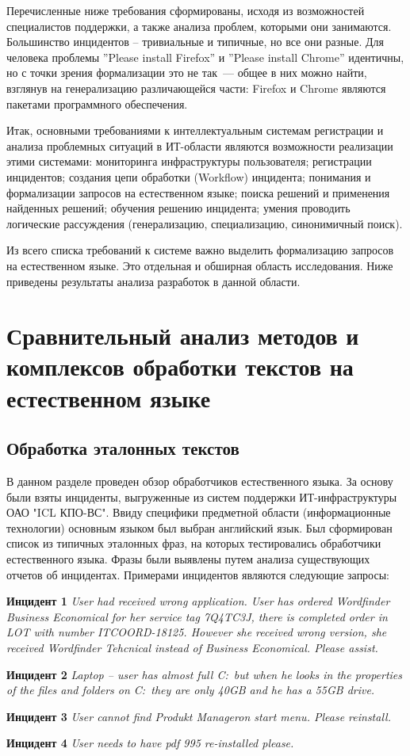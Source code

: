 Перечисленные ниже требования сформированы, исходя из возможностей специалистов поддержки, а также анализа проблем, которыми они занимаются. Большинство инцидентов – тривиальные и типичные, но все они разные. Для человека проблемы ”Please install Firefox” и ”Please install Chrome” идентичны, но с точки зрения формализации это не так~--- общее в них можно найти, взглянув на генерализацию различающейся части: Firefox и Chrome являются пакетами программного обеспечения. \par
Итак, основными требованиями к интеллектуальным системам регистрации и анализа проблемных ситуаций в ИТ-области являются возможности реализации этими системами: мониторинга инфраструктуры пользователя; регистрации инцидентов; создания цепи обработки (Workflow) инцидента; понимания и формализации запросов на естественном языке; поиска решений и применения найденных решений; обучения решению инцидента; умения проводить логические рассуждения (генерализацию, специализацию, синонимичный поиск). \par
Из всего списка требований к системе важно выделить формализацию запросов на естественном языке. Это отдельная и обширная область исследования. Ниже приведены результаты анализа разработок в данной области. 

\clearpage

\section{Сравнительный анализ методов и комплексов обработки текстов на естественном языке}


\subsection{Обработка эталонных текстов} \label{sect2_1}
В данном разделе проведен обзор обработчиков естественного языка. За основу были взяты инциденты, выгруженные из систем поддержки ИТ-инфраструктуры ОАО "ICL КПО-ВС". Ввиду специфики предметной области (информационные технологии) основным языком был выбран английский язык. Был сформирован список из типичных эталонных фраз, на которых тестировались обработчики естественного языка. Фразы были выявлены путем анализа существующих отчетов об инцидентах. Примерами инцидентов являются следующие запросы:\par
\textbf{Инцидент 1}
\textit{
User had received wrong application. User has ordered Wordfinder Business Economical for her service tag 7Q4TC3J, there is completed order in LOT with number ITCOORD-18125. However she received wrong version, she received Wordfinder Tehcnical instead of Business Economical. Please assist.
}\par
\textbf{Инцидент 2}
\textit{
Laptop – user has almost full C:\ but when he looks in the properties of the files and folders on C:\ they are only 40GB and he has a 55GB drive.
}\par
\textbf{Инцидент 3}
\textit{
User cannot find Produkt Manageron start menu. Please reinstall. 
}\par
\textbf{Инцидент 4}
\textit{
User needs to have pdf 995 re-installed please.
}\par

